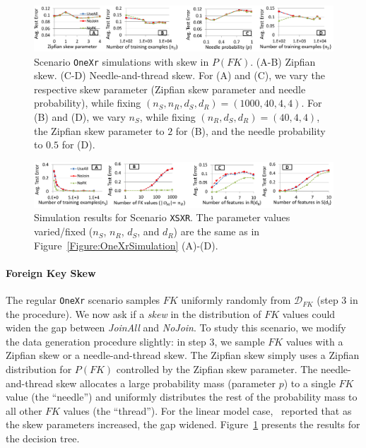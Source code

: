 \documentclass{vldb}
\begin{document}
\begin{figure}[t]
\centering
\includegraphics[width=0.99\linewidth]{skewfk_onexr.pdf}
\vspace{2mm}
\caption{Scenario \texttt{OneXr} simulations with skew in $P(FK)$. (A-B) Zipfian skew. (C-D) Needle-and-thread skew. For (A) and (C), we vary the respective skew parameter
(Zipfian skew parameter and needle probability), while fixing $(n_S, n_R, d_S, d_R) = (1000, 40, 4, 4)$. For (B) and (D), we vary $n_S$, 
while fixing $(n_R, d_S, d_R) = (40, 4, 4)$, the Zipfian skew parameter to $2$ for (B), and the needle probability to $0.5$ for (D).}
\label{Figure:OneXrZipfSimulation}
\end{figure}

\begin{figure}[t]
\centering
\includegraphics[width=0.99\linewidth]{xsxr1.pdf}
\vspace{2mm}
\caption{Simulation results for Scenario \texttt{XSXR}. The parameter values varied/fixed ($n_S$, $n_R$, $d_S$, and $d_R$) are the same as in Figure~\ref{Figure:OneXrSimulation} (A)-(D).}
\label{Figure:XsXrSimulation}
\end{figure}


\paragraph*{Foreign Key Skew}
The regular \texttt{OneXr} scenario samples $FK$ uniformly randomly from $\mathcal{D}_{FK}$ (step 3 in the procedure). We now ask if a \textit{skew} in 
the distribution of $FK$ values could widen the gap between \textit{JoinAll} and \textit{NoJoin}. To study this scenario, we modify the data generation procedure slightly:
in step 3, we sample $FK$ values with a Zipfian skew or a needle-and-thread skew. The Zipfian skew simply uses a Zipfian distribution for $P(FK)$ controlled by the Zipfian
skew parameter. The needle-and-thread skew allocates a large probability mass (parameter $p$) to a single $FK$ value (the ``needle'') and uniformly distributes the rest of 
the probability mass to all other $FK$ values (the ``thread''). For the linear model case,~\cite{hamlet} reported that as the skew parameters increased, the gap widened.
Figure~\ref{Figure:OneXrZipfSimulation} presents the results for the decision tree.
\end{document}
